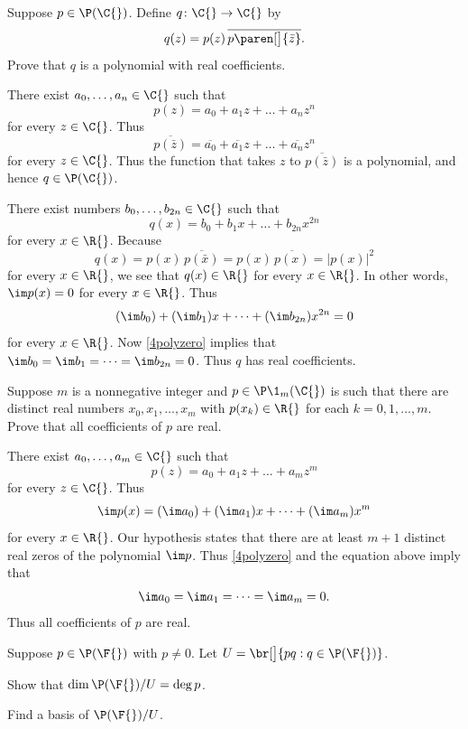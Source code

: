 \exercise
Suppose $p \in \P(\C{})$. Define $q \colon \C{} \to \C{}$ by
\[
q(z) = p(z) \, \overline{ p\paren[\big]{\bar{z}} }.
\]
Prove that $q$ is a polynomial with real coefficients.

\begin{Solution}
There exist $a_0, \dots, a_n \in \C{}$ such that
\[
p(z) = a_0 + a_1 z + \dots + a_n z^n
\]
for every $z \in \C{}$. Thus
\[
\overline{ p(\bar{z}) } = \overline{a_0} + \overline{a_1} z + \dots + \overline{a_n} z^n
\]
for every $z \in \C{}$. Thus the function that takes $z$ to $\overline{ p(\bar{z}) }$ is a polynomial, and hence $q \in \P(\C{})$.

There exist numbers $b_0, \dots, b_{2n} \in \C{}$ such that
\[
q(x) = b_0 + b_1 x + \dots + b_{2n} x^{2n}
\]
for every $x \in \R{}$. Because
\[
q(x) = p(x) \, \overline{ p(\bar{x} ) } = p(x) \, \overline{p(x)} = |p(x)|^2
\]
for every $x \in \R{}$, we see that $q(x) \in \R{}$ for every $x \in \R{}$. In other words, $\im p(x) = 0$ for every $x \in \R{}$. Thus
\[
(\im b_0) + (\im b_1)x + \dots + (\im b_{2n}) x^{2n} = 0
\]
for every $x \in \R{}$. Now \ref{4polyzero} implies that $\im b_0 = \im b_1 = \dots = \im b_{2n} = 0$. Thus $q$ has real coefficients.
\end{Solution}

\exercise
Suppose $m$ is a nonnegative integer and $p \in \P\1_m(\C{})$ is such that there are distinct real numbers $x_0, x_1, \dots, x_m$ with $p(x_k) \in \R{}$ for each $k = 0, 1, \dots, m$. Prove that all coefficients of $p$ are real.

\begin{Solution}
There exist $a_0, \dots, a_m \in \C{}$ such that
\[
p(z) = a_0 + a_1 z + \dots + a_m z^m
\]
for every $z \in \C{}$. Thus
\[
\im p(x) = (\im a_0) + (\im a_1)x + \dots + (\im a_m) x^m
\]
for every $x \in \R{}$. Our hypothesis states that there are at least $m+1$ distinct real zeros of the polynomial $\im p$. Thus \ref{4polyzero} and the equation above imply that
\[
\im a_0 = \im a_1 = \dots = \im a_m = 0.
\]
Thus all coefficients of $p$ are real.
\end{Solution}

\pagebreak[2]

\exercise
Suppose $p \in \P(\F{})$ with $p \ne 0$. Let $U = \br[\big]{p q : q \in \P(\F{})}$.
\begin{subtheorem}
\item
Show that $\dim \P(\F{})/U = \deg p$.
\item
Find a basis of $\P(\F{})/U$.
\end{subtheorem}
\exercisesubtheoremend

